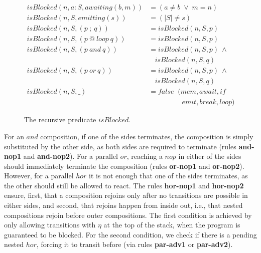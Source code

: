 \documentclass{acm_proc_article-sp}
\newcommand{\rr}[1] {{\textbf{\scriptsize{#1}}}}
\newcommand{\1}{\;}
\newcommand{\2}{\;\;}
\newcommand{\3}{\;\;\;}
\newcommand{\5}{\;\;\;\;\;}
\begin{document}
\begin{figure}[t]
{\small
\begin{align*}
  isBlocked(n,a:S, awaiting(b,m)) &= (a \neq b \1\vee\1 m = n)   \\
  isBlocked(n,S, emitting(s))    &= (|S| \neq s)                     \\
  isBlocked(n,S, (p~;~q))        &= isBlocked(n,S,p)             \\
  isBlocked(n,S, (p~@~loop~q))   &= isBlocked(n,S,p)             \\
  isBlocked(n,S, (p~and~q))      &= isBlocked(n,S,p)~\wedge
                               \\&~~~~isBlocked(n,S,q)             \\
  isBlocked(n,S, (p~or~q))       &= isBlocked(n,S,p)~\wedge
                               \\&~~~~isBlocked(n,S,q)             \\
  isBlocked(n,S, \_)             &= false \2  (mem,await,if \\
                                  &    \5\5\5\2 emit,break,loop)   %
\end{align*}
}%
\caption{
The recursive predicate $isBlocked$.
\label{fig.isBlocked}
}
\end{figure}

For an $and$ composition, if one of the sides terminates, the composition is 
simply substituted by the other side, as both sides are required to terminate 
(rules \rr{and-nop1} and \rr{and-nop2}).
%
For a parallel $or$, reaching a $nop$ in either of the sides should 
immediately terminate the composition (rules \rr{or-nop1} and \rr{or-nop2}).
%
However, for a parallel $hor$ it is not enough that one of the sides 
terminates, as the other should still be allowed to react.
The rules \rr{hor-nop1} and \rr{hor-nop2} ensure, first, that a composition 
rejoins only after no transitions are possible in either sides, and second, 
that rejoins happen from inside out, i.e., that nested compositions rejoin 
before outer compositions.
The first condition is achieved by only allowing transitions with $\eta$ at the 
top of the stack, when the program is guaranteed to be blocked.
For the second condition, we check if there is a pending nested $hor$, forcing 
it to transit before (via rules \rr{par-adv1} or \rr{par-adv2}).
\end{document}
